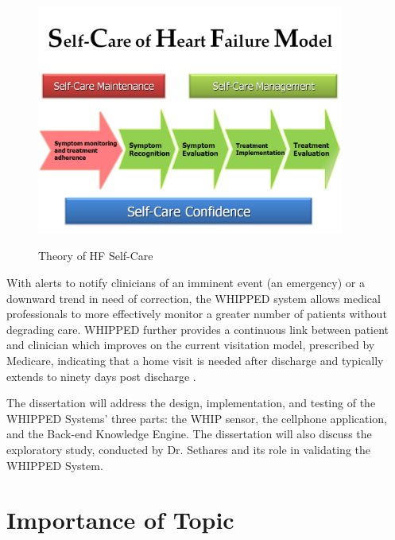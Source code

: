 \begin{figure}[ht]
	\begin{center}
		\label{fig:SelfCare}
		\includegraphics[scale=1,width=0.9\textwidth]{Images/SelfCare_cropped.pdf} 
		\caption{Theory of HF Self-Care }
	\end{center}
\end{figure}

With alerts to notify clinicians of an imminent event (an emergency) or a downward trend in need of correction, the WHIPPED system allows medical professionals to more effectively monitor a greater number of patients without degrading care. WHIPPED further provides a continuous link between patient and clinician which improves on the current visitation model, prescribed by Medicare, indicating that a home visit is needed after discharge and typically extends to ninety days post discharge \cite{Dansky2008}.

The dissertation will address the design, implementation, and testing of the WHIPPED Systems'  three parts: the WHIP sensor, the cellphone application, and the Back-end Knowledge Engine. The dissertation will also discuss the exploratory study, conducted by Dr. Sethares and its role in validating the WHIPPED System.

\section{Importance of Topic}
\label{sec:importanceOfTopic}

